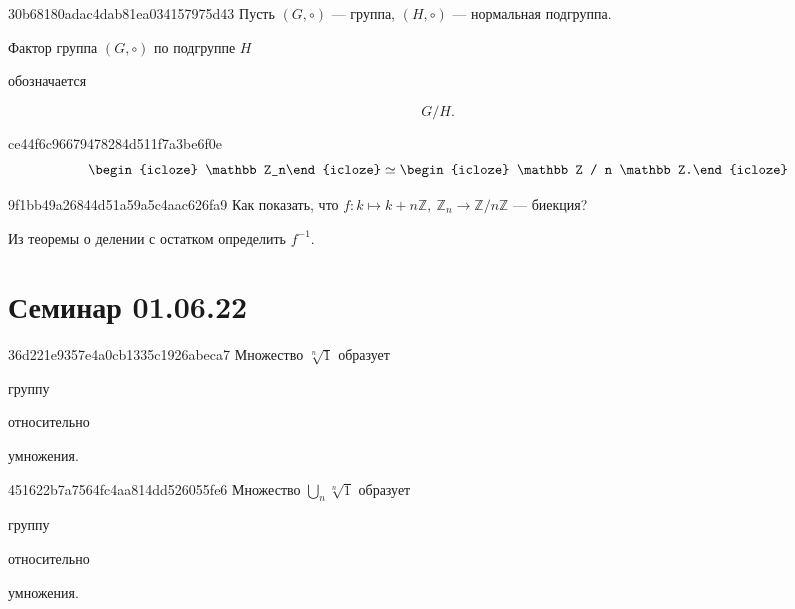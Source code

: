 \begin{note}{30b68180adac4dab81ea034157975d43}
    Пусть \({ (G, \circ) }\) --- группа, \({ (H, \circ) }\) --- нормальная подгруппа.
    \begin{icloze}{2}Фактор группа \({ (G, \circ) }\) по подгруппе \({ H }\)\end{icloze} обозначается
    \begin{icloze}{1}
        \[
            G / H.
        \]
    \end{icloze}
\end{note}

\begin{note}{ce44f6c96679478284d511f7a3be6f0e}
    \[
        \begin{icloze}{2}\mathbb Z_n\end{icloze} \simeq \begin{icloze}{1}\mathbb Z / n \mathbb Z.\end{icloze}
    \]
\end{note}

\begin{note}{9f1bb49a26844d51a59a5c4aac626fa9}
    Как показать, что \({ f : k \mapsto k + n \mathbb Z, \: \mathbb Z_n \to \mathbb Z / n \mathbb Z }\) --- биекция?

    \begin{cloze}{1}
        Из теоремы о делении с остатком определить \({ f^{-1} }\).
    \end{cloze}
\end{note}

\section{Семинар 01.06.22}
\begin{note}{36d221e9357e4a0cb1335c1926abeca7}
    Множество \({ \sqrt[n]{1} }\) образует \begin{icloze}{2}группу\end{icloze} относительно \begin{icloze}{1}умножения.\end{icloze}
\end{note}

\begin{note}{451622b7a7564fc4aa814dd526055fe6}
    Множество \({ \displaystyle \bigcup_{n}^{} \sqrt[n]{1} }\) образует \begin{icloze}{2}группу\end{icloze} относительно \begin{icloze}{1}умножения.\end{icloze}
\end{note}

